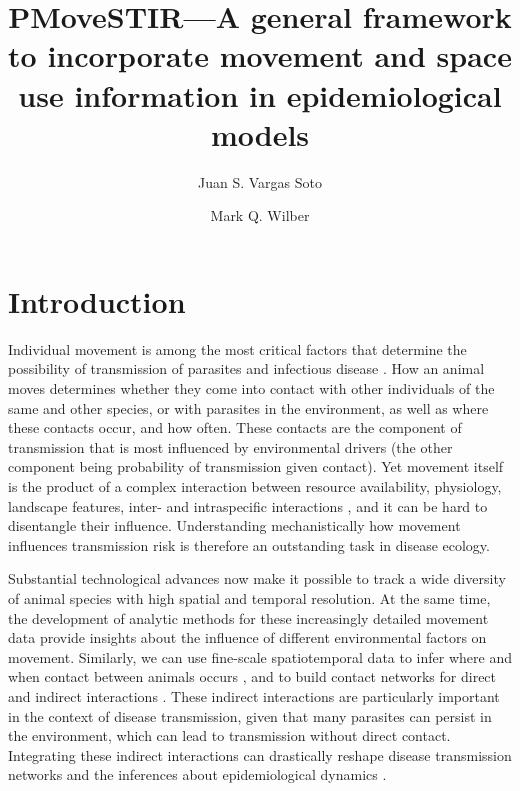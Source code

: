 \documentclass[letterpaper]{article}
\title{PMoveSTIR---A general framework to incorporate movement and space use information in epidemiological models}
\author{Juan S. Vargas Soto \and Mark Q. Wilber}
\date{}
\begin{document}
\maketitle

\linenumbers
\doublespacing

\section*{Introduction}

Individual movement is among the most critical factors that determine the possibility of transmission of parasites and infectious disease \citep{Manlove2022,Dougherty2022}. How an animal moves determines whether they come into contact with other individuals of the same and other species, or with parasites in the environment, as well as where these contacts occur, and how often. These contacts are the component of transmission that is most influenced by environmental drivers (the other component being probability of transmission given contact). Yet movement itself is the product of a complex interaction between resource availability, physiology, landscape features, inter- and intraspecific interactions \citep{Nathan2008}, and it can be hard to disentangle their influence. Understanding mechanistically how movement influences transmission risk is therefore an outstanding task in disease ecology. %

Substantial technological advances now make it possible to track a wide diversity of animal species with high spatial and temporal resolution. At the same time, the development of analytic methods for these increasingly detailed movement data provide insights about the influence of different environmental factors on movement. Similarly, we can use fine-scale spatiotemporal data to infer where and when contact between animals occurs \citep{Noonan2021}, and to build contact networks for direct \citep{Craft2015} and indirect interactions \citep{Yang2023}. These indirect interactions are particularly important in the context of disease transmission, given that many parasites can persist in the environment, which can lead to transmission without direct contact. Integrating these indirect interactions can drastically reshape disease transmission networks and the inferences about epidemiological dynamics \citep{Wilber2022,Richardson2015}.


\end{document}
